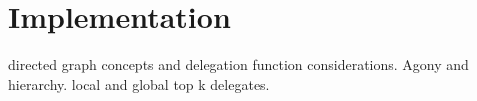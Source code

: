\section{Implementation}
\label{sec:implementation}
directed graph concepts and delegation function considerations.
Agony and hierarchy. local and global top k delegates.